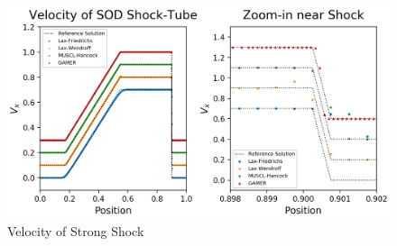 \documentclass[a4paper,10pt]{article}
\begin{document}
\begin{figure}[htbp] %
\centering %
\includegraphics[width=15cm]{velocity_1-1.png} %
\caption{Velocity of Strong Shock}
\end{figure}
\end{document}
